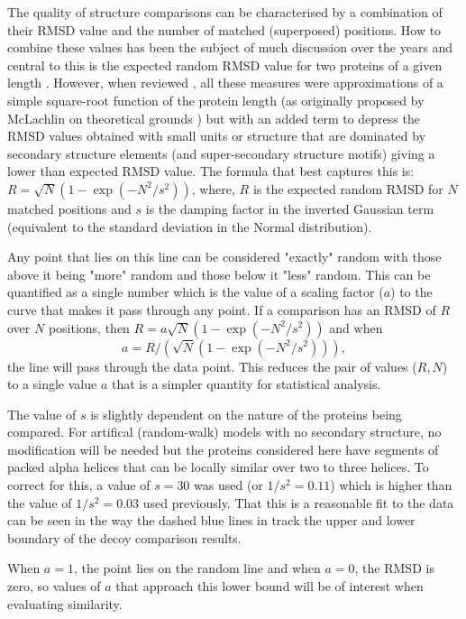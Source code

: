 The quality of structure comparisons can be characterised by a combination of their
RMSD value and the number of matched (superposed) positions.  How to combine these values has
been the subject of much discussion over the years and central to this is the expected random
RMSD value for two proteins of a given length \cite{Mclaughlin,Cohen,Crippen}.   However,
when reviewed \cite{Taylor}, all these measures were approximations of a simple square-root function of
the protein length (as originally proposed by McLachlin on theoretical grounds \cite{McLachlin})
but with an added term to depress the RMSD values obtained with small units or structure
that are dominated by secondary structure elements (and super-secondary structure motifs) 
giving a lower than expected RMSD value.   The formula that best captures this is:
$R = \surd N (1-\exp(-N^2/s^2))$,
where,
$R$ is the expected random RMSD for $N$ matched positions and $s$ is the damping factor in the inverted
Gaussian term (equivalent to the standard deviation in the Normal distribution).  

Any point that lies on this line can be considered "exactly" random
with those above it being "more" random and those below it "less" random.  This can be quantified
as a single number which is the value of a scaling factor ($a$) to the curve that makes it
pass through any point.   If a comparison has an RMSD of $R$ over $N$ positions, then
$R = a\surd N (1-\exp(-N^2/s^2))$ and when
\begin{equation}
\label{Eqn:fit}
a = R/(\surd N (1-\exp(-N^2/s^2))), 
\end{equation}
the line will pass through the data point.  This reduces the pair of values ($R,N$) to a
single value $a$ that is a simpler quantity for statistical analysis.

The value of $s$ is slightly dependent on the nature of the proteins being compared.
For artifical (random-walk)  models with no secondary structure, no modification will be needed but the
proteins considered here have segments of packed alpha helices that can be locally similar
over two to three helices.   To correct for this, a value of $s=30$ was used (or $1/s^2 = 0.11$)
which is higher than the value of $1/s^2 = 0.03$ used previously.
That this is a reasonable fit to the data can be seen in the way the dashed blue lines
in  track the upper and lower boundary of the decoy comparison results.

When $a=1$, the point lies on the random line and when $a=0$, the RMSD is zero, so values of
$a$ that approach this lower bound will be of interest when evaluating similarity. 


